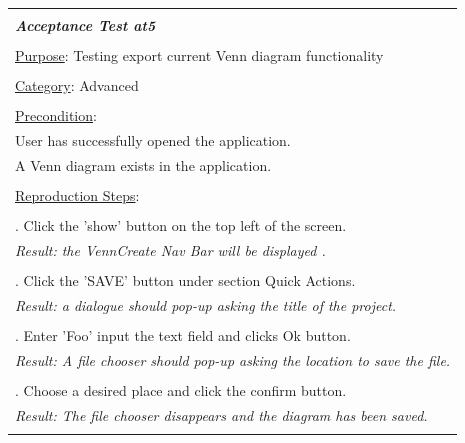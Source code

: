 \documentclass[fontsize=12pt,paper=letter,twoside]{scrartcl}
\begin{document}
\begin{table}[!h]
	\begin{tabular}{|l|}
		\hline
		\\
		\textbf{\emph{Acceptance Test at5}} 	
		\\\\
		\underline{Purpose}: Testing export current Venn diagram functionality \\
		\\
		\underline{Category}: Advanced		\\
		\\
		\underline{Precondition}:															\\ \qquad
		User has successfully opened the application.
		\\ \qquad
		A Venn diagram exists in the application.
		\\\\
		\underline{Reproduction Steps}:				
		\\\\ \qquad 1. Click the 'show' button on the top left of the screen.
		\\ \qquad \textit{Result: the VennCreate Nav Bar will be displayed .} 
		\\\\ \qquad 2. Click the 'SAVE' button under section Quick Actions.
		\\ \qquad \textit{Result: a dialogue should pop-up asking the title of the project.} 
		\\\\ \qquad 3. Enter 'Foo' input the text field and clicks Ok button.
		\\ \qquad \textit{Result: A file chooser should pop-up asking the location to save the file.} 
		\\\\ \qquad 4. Choose a desired place and click the confirm button.
		\\ \qquad \textit{Result: The file chooser disappears and the diagram has been saved.} 
		\\\\
		\hline
	\end{tabular}
\end{table}

\newpage
\end{document}
